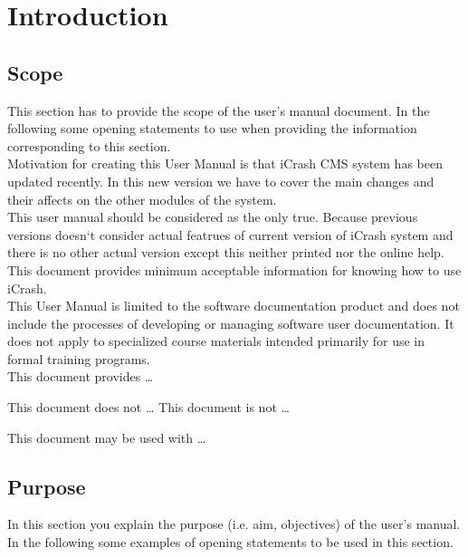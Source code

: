 \chapter{Introduction}
\label{chap:introduction}

\section{Scope}
This section has to provide the scope of the user's manual document.
In the following some opening statements to use when providing the
information corresponding to this section. \\

Motivation for creating this User Manual is that iCrash CMS system has been
updated recently. In this new version we have to cover the main changes and
their affects on the other modules of the system. \\
This user manual should be considered as the only true. Because previous
versions doesn`t consider actual featrues of current version of iCrash system
and there is no other actual version except this neither printed nor the online
help. This document provides minimum acceptable information for knowing how to
use iCrash. \\
This User Manual is limited to the software documentation product and does not
include the processes of developing or managing software user documentation. It does not apply to specialized course materials
intended primarily for use in formal training programs. \\

This document provides \ldots


This document does not \ldots 
This document is not \ldots 

 
This document may be used with \ldots




\section{Purpose}
In this section you explain the purpose (i.e. aim, objectives) of the user's
manual. In the following some examples of opening statements to be used in this
section.

